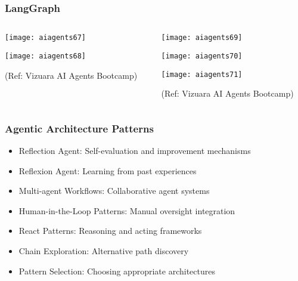 \begin{frame}[fragile]\frametitle{LangGraph}
\begin{columns}
    \begin{column}[T]{0.5\linewidth}
        \begin{center}
		
        \texttt{[image: aiagents67]}
		
        \texttt{[image: aiagents68]}
		
		
		{\tiny (Ref: Vizuara AI Agents Bootcamp)}
				
        \end{center}    
    \end{column}
    \begin{column}[T]{0.5\linewidth}
        \begin{center}
        \texttt{[image: aiagents69]}
		
        \texttt{[image: aiagents70]}
		
        \texttt{[image: aiagents71]}
		
		{\tiny (Ref: Vizuara AI Agents Bootcamp)}
				
        \end{center}    
    \end{column}
  \end{columns}
\end{frame}

\begin{frame}[fragile]\frametitle{Agentic Architecture Patterns}
      \begin{itemize}
        \item Reflection Agent: Self-evaluation and improvement mechanisms
        \item Reflexion Agent: Learning from past experiences
        \item Multi-agent Workflows: Collaborative agent systems
        \item Human-in-the-Loop Patterns: Manual oversight integration
        \item React Patterns: Reasoning and acting frameworks
        \item Chain Exploration: Alternative path discovery
        \item Pattern Selection: Choosing appropriate architectures
      \end{itemize}
\end{frame}

